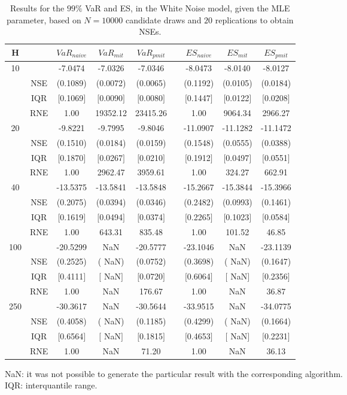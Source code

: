 \begin{table}[h] 
\centering 
\caption{Results for the $99\%$ VaR and ES, in the White Noise model, given the MLE parameter, based on $N=10000$ candidate draws and $20$ replications to obtain NSEs.} 
\label{tab:res_algos_WN_ML} 
\begin{tabular}{ccccccccc}  
 H & & $VaR_{naive}$ & $VaR_{mit}$ & $VaR_{pmit}$ &  & $ES_{naive}$ & $ES_{mit}$ & $ES_{pmit}$ \\ \hline 
10 & & -7.0474 & -7.0326 & -7.0346 & & -8.0473 & -8.0140 & -8.0127  \\ 
  & NSE & (0.1089) & (0.0072) & (0.0065) & & (0.1192) & (0.0105) & (0.0184)   \\ 
 & IQR & $[$0.1069$]$ & $[$0.0090$]$ & $[$0.0080$]$ & & $[$0.1447$]$ & $[$0.0122$]$ & $[$0.0208$]$  \\  
  & RNE &   1.00 & 19352.12 & 23415.26 & &   1.00 & 9064.34 & 2966.27   \\ [1ex] 
20 & & -9.8221 & -9.7995 & -9.8046 & & -11.0907 & -11.1282 & -11.1472  \\ 
  & NSE & (0.1510) & (0.0184) & (0.0159) & & (0.1548) & (0.0555) & (0.0388)   \\ 
 & IQR & $[$0.1870$]$ & $[$0.0267$]$ & $[$0.0210$]$ & & $[$0.1912$]$ & $[$0.0497$]$ & $[$0.0551$]$  \\  
  & RNE &   1.00 & 2962.47 & 3959.61 & &   1.00 & 324.27 & 662.91   \\ [1ex] 
40 & & -13.5375 & -13.5841 & -13.5848 & & -15.2667 & -15.3844 & -15.3966  \\ 
  & NSE & (0.2075) & (0.0394) & (0.0346) & & (0.2482) & (0.0993) & (0.1461)   \\ 
 & IQR & $[$0.1619$]$ & $[$0.0494$]$ & $[$0.0374$]$ & & $[$0.2265$]$ & $[$0.1023$]$ & $[$0.0584$]$  \\  
  & RNE &   1.00 & 643.31 & 835.48 & &   1.00 & 101.52 &  46.85   \\ [1ex] 
100 & & -20.5299 &    NaN & -20.5777 & & -23.1046 &    NaN & -23.1139  \\ 
  & NSE & (0.2525) & (   NaN) & (0.0752) & & (0.3698) & (   NaN) & (0.1647)   \\ 
 & IQR & $[$0.4111$]$ & $[$   NaN$]$ & $[$0.0720$]$ & & $[$0.6064$]$ & $[$   NaN$]$ & $[$0.2356$]$  \\  
  & RNE &   1.00 &    NaN & 176.67 & &   1.00 &    NaN &  36.87   \\ [1ex] 
250 & & -30.3617 &    NaN & -30.5644 & & -33.9515 &    NaN & -34.0775  \\ 
  & NSE & (0.4058) & (   NaN) & (0.1185) & & (0.4299) & (   NaN) & (0.1664)   \\ 
 & IQR & $[$0.6564$]$ & $[$   NaN$]$ & $[$0.1815$]$ & & $[$0.4653$]$ & $[$   NaN$]$ & $[$0.2231$]$  \\  
  & RNE &   1.00 &    NaN &  71.20 & &   1.00 &    NaN &  36.13   \\ [1ex] 
\hline 
\end{tabular} 
\raggedright 

\vspace{5pt}\footnotesize{NaN: it was not possible to generate the particular result with the corresponding algorithm.} \\ 
\vspace{5pt}\footnotesize{IQR: interquantile range.} 
\end{table} 
